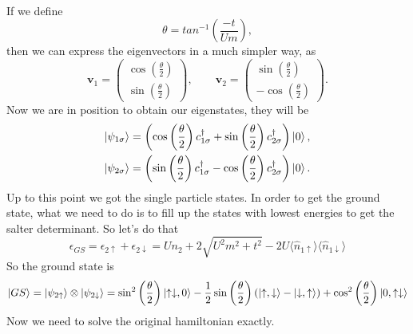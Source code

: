 \begin{questions}
\begin{solution}
\begin{equation}
\begin{aligned}
 \end{aligned}
\end{equation}
If we define
\begin{equation}
  \theta = tan^{-1} \left(\frac{-t}{Um} \right),
\end{equation}
then we can express the eigenvectors in a much simpler way, as
\begin{equation}
  \bm{v}_1 = \begin{pmatrix}
    \cos \left(\frac{\theta}{2}\right) \\
    \sin \left(\frac{\theta}{2}\right)
\end{pmatrix}, \qquad \bm{v}_2 = \begin{pmatrix}
  \sin \left(\frac{\theta}{2}\right) \\
  -\cos \left(\frac{\theta}{2}\right)
\end{pmatrix}.
\end{equation}
Now we are in position to obtain our eigenstates, they will be
\begin{eqnarray}
  \ket{\psi_{1\sigma}} = \left(\cos \left(\frac{\theta}{2}\right) c_{1\sigma}^\dagger + \sin \left(\frac{\theta}{2}\right) c_{2\sigma}^\dagger\right)\ket{0}, \\
  \ket{\psi_{2\sigma}} = \left(\sin \left(\frac{\theta}{2}\right) c_{1\sigma}^\dagger - \cos \left(\frac{\theta}{2}\right) c_{2\sigma}^\dagger\right)\ket{0}.
\end{eqnarray}
Up to this point we got the single particle states. In order to get the ground state, what we need to do is to fill up the states with lowest energies to get the salter determinant. So let's do that
\begin{equation}
  \epsilon_{GS} = \epsilon_{2\uparrow} + \epsilon_{2\downarrow} = Un_2 + 2\sqrt{U^2 m^2 + t^2} - 2 U \langle\hat{n}_{1 \uparrow}\rangle \langle\hat{n}_{1\downarrow}\rangle
\end{equation}
So the ground state is
\begin{equation}
  \ket{GS} = \ket{\psi_{2\uparrow}}\otimes \ket{\psi_{2\downarrow}} = \sin^2 \left(\frac{\theta}{2}\right) \ket{\uparrow \downarrow, 0 } - \frac{1}{2}\sin \left(\frac{\theta}{2}\right)(\ket{\uparrow, \downarrow} - \ket{\downarrow, \uparrow}) + \cos^2 \left(\frac{\theta}{2}\right)\ket{0,\uparrow \downarrow }
\end{equation}
Now we need to solve the original hamiltonian exactly.


\end{solution}
\end{questions}
